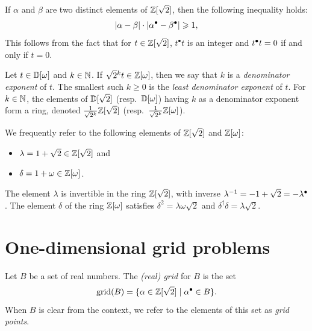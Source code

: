 \documentclass{article}
\begin{document}
\begin{remark}
If $\alpha$ and $\beta$ are two distinct elements of $\mathbb{Z}[\sqrt 2]$, 
then the following inequality holds:
  \begin{equation}\label{eqn-discrete}
    |\alpha-\beta|\cdot |\alpha^{\bullet}-\beta^{\bullet}| \geqslant 1,
  \end{equation}
This follows from the fact that for $t\in\mathbb{Z}[\sqrt 2]$, 
$t^\bullet t$ is an integer and $t^{\bullet} t=0$ if and only if $t=0$.
\end{remark}  

\begin{definition}
\label{def-denomexp}
Let $t\in {\mathbb{D}}[\omega]$ and $k\in\mathbb{N}$. If $\sqrt{2}{}^{k}t\in\mathbb{Z}[\omega]$, 
then we say that $k$ is a \emph{denominator exponent} of $t$. 
The smallest such $k\geq 0$ is the \emph{least denominator exponent} 
of $t$. For $k\in\mathbb{N}$, the elements of ${\mathbb{D}}[\sqrt 2]$ (resp.\ ${\mathbb{D}}[\omega]$) 
having $k$ as a denominator exponent form a ring, denoted 
$\frac{1}{\sqrt{2}{}^{k}}\mathbb{Z}[\sqrt 2]$ (resp.\ $\frac{1}{\sqrt{2}{}^{k}}\mathbb{Z}[\omega]$).
\end{definition}

\begin{definition}
We frequently refer to the following elements of $\mathbb{Z}[\sqrt 2]$ and 
$\mathbb{Z}[\omega]$:
\begin{itemize}
  \item $\lambda=1+\sqrt{2} \in \mathbb{Z}[\sqrt 2]$ and
  \item $\delta = 1+\omega\in\mathbb{Z}[\omega]$.
\end{itemize}
\end{definition}

\begin{remark}
  The element $\lambda$ is invertible in the ring $\mathbb{Z}[\sqrt 2]$, with
  inverse $\lambda^{-1} = -1+\sqrt{2}=-\lambda^{\bullet}$. The element
  $\delta$ of the ring $\mathbb{Z}[\omega]$ satisfies
  $\delta^2=\lambda\omega\sqrt{2}$ and
  $\delta^{\dagger}\delta=\lambda\sqrt{2}$.
\end{remark}

\section{One-dimensional grid problems}
\label{sec-grid-1d}

\begin{definition}
  Let $B$ be a set of real numbers. The {\em (real) grid} for $B$ is
  the set
  \begin{equation}
    \mathop{\rm grid}\nolimits(B) = \{ \alpha\in\mathbb{Z}[\sqrt 2] \mid \alpha^{\bullet} \in B\}.
  \end{equation}
  When $B$ is clear from the context, we refer to the elements of this
  set as {\em grid points}.
\end{definition}
\end{document}
